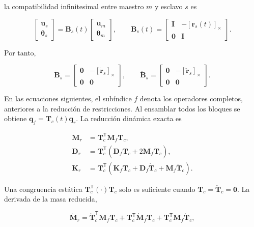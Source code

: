la compatibilidad infinitesimal entre maestro $m$ y esclavo $s$ es

\begin{equation}
 \begin{bmatrix}\bm u_s\\\bm\theta_s\end{bmatrix}
 =\bm B_s(t)
 \begin{bmatrix}\bm u_m\\\bm\theta_m\end{bmatrix},
 \qquad
 \bm B_s(t)=
 \begin{bmatrix}
 \bm I&-[\bm r_s(t)]_\times\\
 \bm 0&\bm I
 \end{bmatrix}.
 \label{prefgyro:Bslave}
\end{equation}

Por tanto,

\begin{equation}
 \dot{\bm B}_s=
 \begin{bmatrix}\bm 0&-[\dot{\bm r}_s]_\times\\\bm 0&\bm 0\end{bmatrix},
 \qquad
 \ddot{\bm B}_s=
 \begin{bmatrix}\bm 0&-[\ddot{\bm r}_s]_\times\\\bm 0&\bm 0\end{bmatrix}.
 \label{prefgyro:Bslave-derivadas}
\end{equation}

En las ecuaciones siguientes, el subíndice $f$ denota los operadores completos, anteriores a la reducción de restricciones. Al ensamblar todos los bloques se obtiene
$\bm q_f=\bm T_c(t)\bm q_r$. La reducción dinámica exacta es

\begin{align}
 \bm M_r&=\bm T_c^{\mathsf T}\bm M_f\bm T_c,
 \label{prefgyro:Mred}\\
 \bm D_r&=\bm T_c^{\mathsf T}
 \left(\bm D_f\bm T_c+2\bm M_f\dot{\bm T}_c\right),
 \label{prefgyro:Dred}\\
 \bm K_r&=\bm T_c^{\mathsf T}
 \left(\bm K_f\bm T_c+\bm D_f\dot{\bm T}_c
 +\bm M_f\ddot{\bm T}_c\right).
 \label{prefgyro:Kred}
\end{align}

Una congruencia estática $\bm T_c^{\mathsf T}(\cdot)\bm T_c$ solo es suficiente
cuando $\dot{\bm T}_c=\ddot{\bm T}_c=\bm 0$. La derivada de la masa reducida,

\begin{equation}
 \dot{\bm M}_r
 =\dot{\bm T}_c^{\mathsf T}\bm M_f\bm T_c
 +\bm T_c^{\mathsf T}\dot{\bm M}_f\bm T_c
 +\bm T_c^{\mathsf T}\bm M_f\dot{\bm T}_c,
 \label{prefgyro:Mred-dot}
\end{equation}


